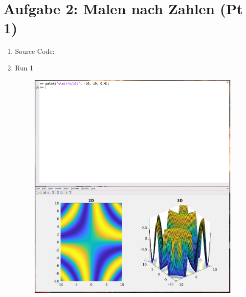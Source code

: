 \documentclass[12pt,a4paper]{article}
\begin{document}
\section*{Aufgabe 2: Malen nach Zahlen (Pt 1)}
\begin{enumerate}[leftmargin=!,labelindent=5pt]
	\item Source Code:
		

	\item Run 1
		\begin{figure}[H]
			\centering
			\includegraphics[scale=0.2]{./img/paint_01.png}\label{fig:1}
		\end{figure}


\end{enumerate}
\end{document}
